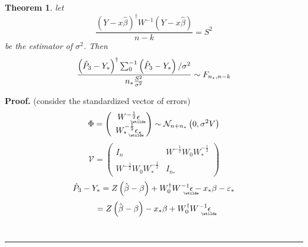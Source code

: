 \documentclass{article}
\newtheorem{theorem}{Theorem}
\newenvironment{proof}[1][Proof]{\noindent\textbf{#1.} }{\ \rule{0.5em}{0.5em}}
\begin{document}
\bigskip

\begin{theorem}
let 
\begin{equation*}
\frac{\left( Y-x\hat{\beta}\right) ^{\dagger }W^{-1}\left( Y-x\hat{\beta}%
\right) }{n-k}=S^{2}
\end{equation*}%
be the estimator of $\sigma ^{2}$. Then 
\begin{equation*}
\frac{\left( \hat{P}_{3}-Y_{\ast }\right) ^{\dagger
}\tsum\nolimits_{0}^{-1}\left( \hat{P}_{3}-Y_{\ast }\right) /\sigma ^{2}}{%
n_{\ast }\frac{S^{2}}{\sigma ^{2}}}\sim F_{n_{\ast },n-k}
\end{equation*}
\end{theorem}

\begin{proof}
(consider the standardized vector of errors)%
\begin{equation*}
\Phi =\left( 
\begin{array}{c}
W^{-\frac{1}{2}}%
\underaccent{\wtilde}{\epsilon}
\\ 
W_{\ast }^{-\frac{1}{2}}%
\underaccent{\wtilde}{\epsilon}%
_{\ast }%
\end{array}%
\right) \sim \mathcal{N}_{n+n_{\ast }}\left( 0,\sigma ^{2}V\right)
\end{equation*}%
\begin{equation*}
\mathcal{V=}\left( 
\begin{array}{cc}
I_{n} & W^{-\frac{1}{2}}W_{0}W_{\ast }^{-\frac{1}{2}} \\ 
W^{-\frac{1}{2}}W_{0}W_{\ast }^{-\frac{1}{2}} & I_{n_{\ast }}%
\end{array}%
\right)
\end{equation*}%
\begin{equation*}
\hat{P}_{3}-Y_{\ast }=Z\left( \hat{\beta}-\beta \right) +W_{0}^{\dagger
}W^{-1}%
\underaccent{\wtilde}{\epsilon}%
-x_{\ast }\beta -\varepsilon _{\ast }
\end{equation*}%
\begin{equation*}
=Z\left( \hat{\beta}-\beta \right) -x_{\ast }\beta +W_{0}^{\dagger }W^{-1}%
\underaccent{\wtilde}{\epsilon}%

\end{equation*}
\end{proof}
\end{document}
